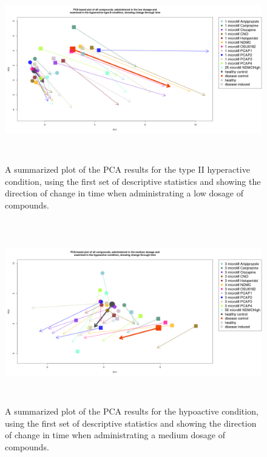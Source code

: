 \documentclass[a4paper,12pt]{article}
\begin{document}
\newpage
\begin{figure}[h!]
\begin{center}
\includegraphics[width=16cm,height=8cm]{All_together_1_microM_DarkPTZ_in_time.png}
\caption{A summarized plot of the PCA results for the type II hyperactive condition, using the first set of descriptive statistics and showing the direction of change in time when administrating a low dosage of compounds.}
\end{center}
\end{figure}
\newpage
\begin{figure}[h!]
\begin{center}
\includegraphics[width=16cm,height=8cm]{All_together_3_microM_DarkApoLow_in_time.png}
\caption{A summarized plot of the PCA results for the hypoactive condition, using the first set of descriptive statistics and showing the direction of change in time when administrating a medium dosage of compounds.}
\end{center}
\end{figure}
\end{document}
